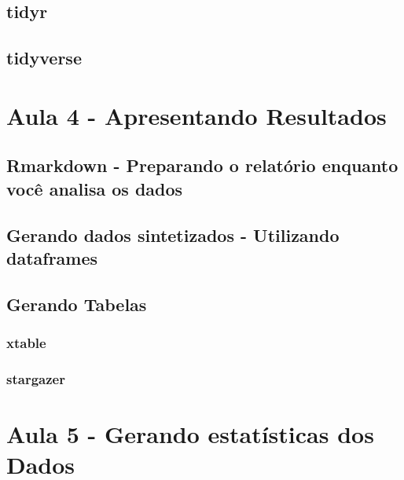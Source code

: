 \documentclass[12pt,a4paper,oneside]{erdc}
\begin{document}
	\section{tidyr}
	
	\section{tidyverse}






%
%

\chapter{Aula 4 - Apresentando Resultados}

	\section{Rmarkdown - Preparando o relatório enquanto você analisa os dados}
	
	\section{Gerando dados sintetizados - Utilizando dataframes}
	
	\section{Gerando Tabelas}
	
		\subsection{xtable}
		
		\subsection{stargazer}





%
%


\chapter{Aula 5 - Gerando estatísticas dos Dados}
\end{document}
